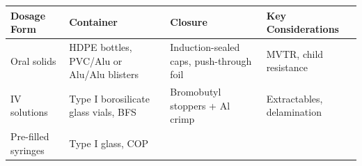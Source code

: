 \documentclass[
  11pt,
  a4paper,
]{report}
\begin{document}
\begin{longtable}[]{@{}llll@{}}
\toprule
\begin{minipage}[b]{0.22\columnwidth}\raggedright
Dosage Form\strut
\end{minipage} & \begin{minipage}[b]{0.19\columnwidth}\raggedright
Container\strut
\end{minipage} & \begin{minipage}[b]{0.15\columnwidth}\raggedright
Closure\strut
\end{minipage} & \begin{minipage}[b]{0.32\columnwidth}\raggedright
Key Considerations\strut
\end{minipage}\tabularnewline
\midrule
\endhead
\begin{minipage}[t]{0.22\columnwidth}\raggedright
Oral solids\strut
\end{minipage} & \begin{minipage}[t]{0.19\columnwidth}\raggedright
HDPE bottles, PVC/Alu or Alu/Alu blisters\strut
\end{minipage} & \begin{minipage}[t]{0.15\columnwidth}\raggedright
Induction-sealed caps, push-through foil\strut
\end{minipage} & \begin{minipage}[t]{0.32\columnwidth}\raggedright
MVTR, child resistance\strut
\end{minipage}\tabularnewline
\begin{minipage}[t]{0.22\columnwidth}\raggedright
IV solutions\strut
\end{minipage} & \begin{minipage}[t]{0.19\columnwidth}\raggedright
Type I borosilicate glass vials, BFS\strut
\end{minipage} & \begin{minipage}[t]{0.15\columnwidth}\raggedright
Bromobutyl stoppers + Al crimp\strut
\end{minipage} & \begin{minipage}[t]{0.32\columnwidth}\raggedright
Extractables, delamination\strut
\end{minipage}\tabularnewline
\begin{minipage}[t]{0.22\columnwidth}\raggedright
Pre-filled syringes\strut
\end{minipage} & \begin{minipage}[t]{0.19\columnwidth}\raggedright
Type I glass, COP\strut
\end{minipage} & \begin{minipage}[t]{0.15\columnwidth}\raggedright

\end{minipage}
\end{longtable}
\end{document}
